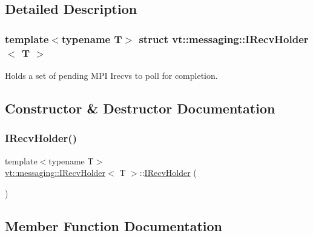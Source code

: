 \subsection{Detailed Description}
\subsubsection*{template$<$typename T$>$\newline
struct vt\+::messaging\+::\+I\+Recv\+Holder$<$ T $>$}

Holds a set of pending M\+PI Irecvs to poll for completion. 

\subsection{Constructor \& Destructor Documentation}
\mbox{\label{structvt_1_1messaging_1_1_i_recv_holder_a709a349d723247b10bf57ca2831bfe19}} 
\subsubsection{\texorpdfstring{I\+Recv\+Holder()}{IRecvHolder()}}
{\footnotesize\ttfamily template$<$typename T$>$ \\
\hyperlink{structvt_1_1messaging_1_1_i_recv_holder}{vt\+::messaging\+::\+I\+Recv\+Holder}$<$ T $>$\+::\hyperlink{structvt_1_1messaging_1_1_i_recv_holder}{I\+Recv\+Holder} (\begin{DoxyParamCaption}{ }\end{DoxyParamCaption})\hspace{0.3cm}{\ttfamily [default]}}



\subsection{Member Function Documentation}
\mbox{\label{structvt_1_1messaging_1_1_i_recv_holder_ab81d251a84cb2c8366eb5f5052ce002c}} 
